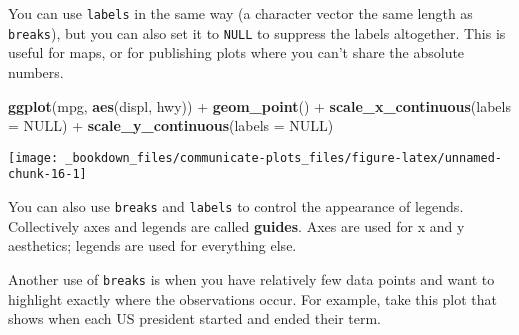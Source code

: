 \documentclass[]{book}
\newenvironment{Shaded}{\begin{snugshade}}{\end{snugshade}}
\newcommand{\KeywordTok}[1]{\textcolor[rgb]{0.13,0.29,0.53}{\textbf{{#1}}}}
\newcommand{\DataTypeTok}[1]{\textcolor[rgb]{0.13,0.29,0.53}{{#1}}}
\newcommand{\DecValTok}[1]{\textcolor[rgb]{0.00,0.00,0.81}{{#1}}}
\newcommand{\StringTok}[1]{\textcolor[rgb]{0.31,0.60,0.02}{{#1}}}
\newcommand{\OtherTok}[1]{\textcolor[rgb]{0.56,0.35,0.01}{{#1}}}
\newcommand{\NormalTok}[1]{{#1}}
\begin{document}
You can use \texttt{labels} in the same way (a character vector the same
length as \texttt{breaks}), but you can also set it to \texttt{NULL} to
suppress the labels altogether. This is useful for maps, or for
publishing plots where you can't share the absolute numbers.

\begin{Shaded}
\begin{Highlighting}[]
\KeywordTok{ggplot}\NormalTok{(mpg, }\KeywordTok{aes}\NormalTok{(displ, hwy)) +}
\StringTok{  }\KeywordTok{geom_point}\NormalTok{() +}
\StringTok{  }\KeywordTok{scale_x_continuous}\NormalTok{(}\DataTypeTok{labels =} \OtherTok{NULL}\NormalTok{) +}
\StringTok{  }\KeywordTok{scale_y_continuous}\NormalTok{(}\DataTypeTok{labels =} \OtherTok{NULL}\NormalTok{)}
\end{Highlighting}
\end{Shaded}

\begin{center}\texttt{[image: \_bookdown\_files/communicate-plots\_files/figure-latex/unnamed-chunk-16-1]} \end{center}

You can also use \texttt{breaks} and \texttt{labels} to control the
appearance of legends. Collectively axes and legends are called
\textbf{guides}. Axes are used for x and y aesthetics; legends are used
for everything else.

Another use of \texttt{breaks} is when you have relatively few data
points and want to highlight exactly where the observations occur. For
example, take this plot that shows when each US president started and
ended their term.

\begin{Shaded}
\end{Shaded}
\end{document}
